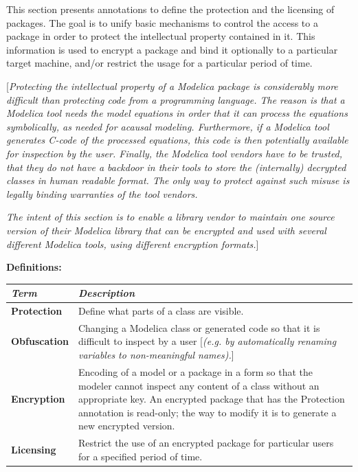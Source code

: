 \documentclass[10pt,a4paper]{report}
\begin{document}
This section presents annotations to define the protection and the
licensing of packages. The goal is to unify basic mechanisms to control
the access to a package in order to protect the intellectual property
contained in it. This information is used to encrypt a package and bind
it optionally to a particular target machine, and/or restrict the usage
for a particular period of time.

{[}\emph{Protecting the intellectual property of a Modelica package is
considerably more difficult than protecting code from a programming
language. The reason is that a Modelica tool needs the model equations
in order that it can process the equations symbolically, as needed for
acausal modeling. Furthermore, if a Modelica tool generates C-code of
the processed equations, this code is then potentially available for
inspection by the user. Finally, the Modelica tool vendors have to be
trusted, that they do not have a backdoor in their tools to store the
(internally) decrypted classes in human readable format. The only way to
protect against such misuse is legally binding warranties of the tool
vendors. }

\emph{The intent of this section is to enable a library vendor to
maintain one source version of their Modelica library that can be
encrypted and used with several different Modelica tools, using
different encryption formats.}{]}

\textbf{Definitions:}

\begin{longtable}[]{@{}ll@{}}
\hline
\emph{Term} & \emph{Description}\\ \hline

\endhead
\textbf{Protection} & Define what parts of a class are
visible.\\ \hline
\textbf{Obfuscation} & Changing a Modelica class or generated code so
that it is difficult to inspect by a user {[}\emph{(e.g. by
automatically renaming variables to non-meaningful
names).}{]}\\ \hline
\textbf{Encryption} & Encoding of a model or a package in a form so that
the modeler cannot inspect any content of a class without an appropriate
key. An encrypted package that has the Protection annotation is
read-only; the way to modify it is to generate a new encrypted
version.\\ \hline
\textbf{Licensing} & Restrict the use of an encrypted package for
particular users for a specified period of time.\\ \hline

\end{longtable}
\end{document}

